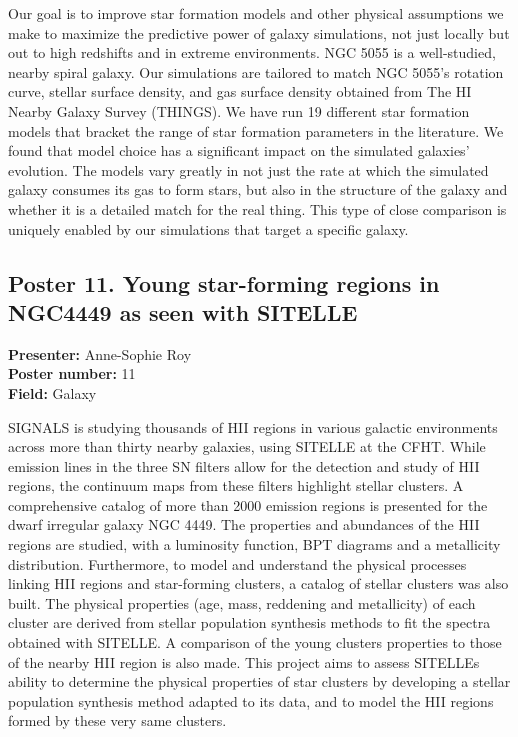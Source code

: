 Our goal is to improve star formation models and other physical assumptions we make to maximize the predictive power of galaxy simulations, not just locally but out to high redshifts and in extreme environments. NGC 5055 is a well-studied, nearby spiral galaxy. Our simulations are tailored to match NGC 5055's rotation curve, stellar surface density, and gas surface density obtained from The HI Nearby Galaxy Survey (THINGS). We have run 19 different star formation models that bracket the range of star formation parameters in the literature. We found that model choice has a significant impact on the simulated galaxies' evolution. The models vary greatly in not just the rate at which the simulated galaxy consumes its gas to form stars, but also in the structure of the galaxy and whether it is a detailed match for the real thing. This type of close comparison is uniquely enabled by our simulations that target a specific galaxy.

\hypertarget{poster-abstract-talk-72}{}\label{poster-abstract-page-talk-72}
\subsection*{Poster 11. Young star-forming regions in NGC4449 as seen with SITELLE}
\textbf{Presenter:} Anne-Sophie Roy\\
\textbf{Poster number:} 11\\
\textbf{Field:} Galaxy

SIGNALS is studying thousands of HII regions in various galactic environments across more than thirty nearby galaxies, using SITELLE at the CFHT. While emission lines in the three SN filters allow for the detection and study of HII regions, the continuum maps from these filters highlight stellar clusters. A comprehensive catalog of more than 2000 emission regions is presented for the dwarf irregular galaxy NGC 4449. The properties and abundances of the HII regions are studied, with a luminosity function, BPT diagrams and a metallicity distribution. Furthermore, to model and understand the physical processes linking HII regions and star-forming clusters, a catalog of stellar clusters was also built. The physical properties (age, mass, reddening and metallicity) of each cluster are derived from stellar population synthesis methods to fit the spectra obtained with SITELLE. A comparison of the young clusters properties to those of the nearby HII region is also made. This project aims to assess SITELLEs ability to determine the physical properties of star clusters by developing a stellar population synthesis method adapted to its data, and to model the HII regions formed by these very same clusters.

